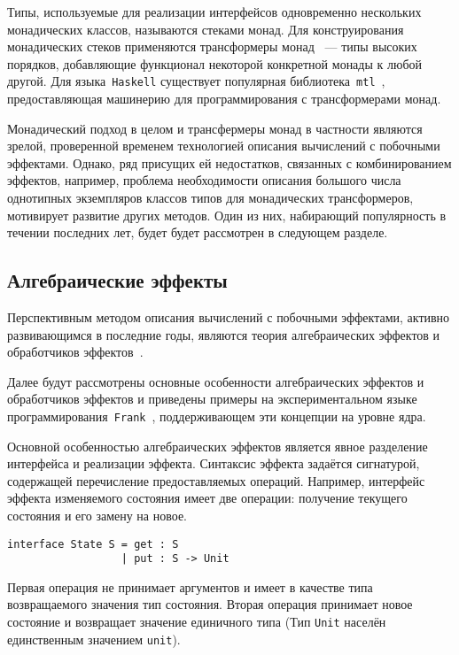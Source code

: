 \documentclass [a4paper] {article}
\begin{document}
Типы, используемые для реализации интерфейсов одновременно нескольких
монадических классов, называются стеками монад. Для конструирования
монадических стеков применяются трансформеры монад~\cite{monadTransformers}
--- типы высоких порядков,
добавляющие функционал некоторой конкретной монады к любой другой. Для
языка~\texttt{Haskell} существует популярная
библиотека~\texttt{mtl}~\cite{mtlHackage}, предоставляющая машинерию для
программирования с трансформерами монад.

Монадический подход в целом и трансфермеры монад в частности являются зрелой,
проверенной временем технологией описания вычислений с побочными эффектами.
Однако, ряд присущих ей недостатков, связанных с комбинированием эффектов,
например, проблема необходимости описания большого числа однотипных
экземпляров классов типов для монадических трансформеров, мотивирует развитие
других методов. Один из них, набирающий популярность
в течении последних лет, будет будет рассмотрен в следующем разделе.

\subsection{Алгебраические эффекты}

Перспективным методом описания вычислений с побочными эффектами, активно
развивающимся в последние годы, являются теория алгебраических
эффектов и обработчиков эффектов~\cite{AlgEffects}.

Далее будут рассмотрены основные особенности алгебраических эффектов и
обработчиков эффектов и приведены примеры на экспериментальном языке
программирования~\texttt{Frank}~\cite{Frank}, поддерживающем эти концепции на
уровне ядра.

Основной особенностью алгебраических эффектов является явное разделение
интерфейса и реализации эффекта. Синтаксис эффекта задаётся сигнатурой,
содержащей перечисление предоставляемых операций. Например, интерфейс
эффекта изменяемого состояния имеет две операции: получение текущего
состояния и его замену на новое.

\begin{verbatim}
interface State S = get : S
                  | put : S -> Unit
\end{verbatim}

Первая операция не принимает аргументов и имеет в качестве типа возвращаемого
значения тип состояния. Вторая операция принимает новое состояние и возвращает
значение единичного типа (Тип \texttt{Unit} населён единственным значением
\texttt{unit}).
\end{document}
